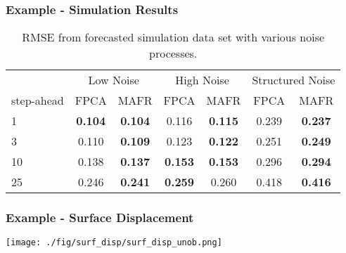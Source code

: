\documentclass[aspectratio=169]{beamer}
\begin{document}
  \begin{frame}
    \frametitle{Example - Simulation Results}
    \begin{table}[h]
        \setlength{\arrayrulewidth}{1.5px}
        \setlength{\tabcolsep}{10pt}
        \centering
        \begin{tabular}{lcccccc} \toprule
            & \multicolumn{2}{c}{Low Noise} & \multicolumn{2}{c}{High Noise} & \multicolumn{2}{c}{Structured Noise} \\
            step-ahead & FPCA & MAFR & FPCA & MAFR & FPCA & MAFR \\ \bottomrule
            1 & \textbf{0.104} & \textbf{0.104} & 0.116 & \textbf{0.115} & 0.239 & \textbf{0.237} \\
            3 & 0.110 & \textbf{0.109} & 0.123 & \textbf{0.122} & 0.251 & \textbf{0.249} \\
            10 & 0.138 & \textbf{0.137} & \textbf{0.153} & \textbf{0.153} & 0.296 & \textbf{0.294} \\
            25 & 0.246 & \textbf{0.241} & \textbf{0.259} & 0.260 & 0.418 & \textbf{0.416} \\
            \bottomrule
        \end{tabular}
        \caption{RMSE from forecasted simulation data set with various noise processes.}
    \end{table}
  \end{frame}

  \begin{frame}
    \frametitle{Example - Surface Displacement}
    
    \begin{center}
      \texttt{[image: ./fig/surf\_disp/surf\_disp\_unob.png]}
    \end{center}
    
  \end{frame}
\end{document}
